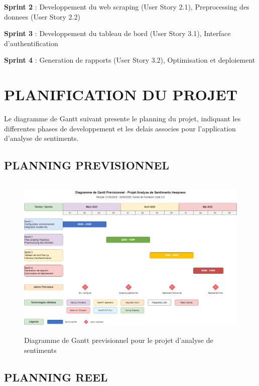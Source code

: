 \textbf{Sprint 2} : Developpement du web scraping (User Story 2.1), Preprocessing des donnees (User Story 2.2)

\textbf{Sprint 3} : Developpement du tableau de bord (User Story 3.1), Interface d'authentification

\textbf{Sprint 4} : Generation de rapports (User Story 3.2), Optimisation et deploiement

\section{PLANIFICATION DU PROJET}

Le diagramme de Gantt suivant presente le planning du projet, indiquant les differentes phases de developpement et les delais associes pour l'application d'analyse de sentiments.

\subsection{PLANNING PREVISIONNEL}

\begin{figure}[H]
\centering
\includegraphics[height=8cm , width=\textwidth]{assets/images/gantt-previsionnel.png}
\caption{Diagramme de Gantt previsionnel pour le projet d'analyse de sentiments}
\label{fig:gantt-prev}
\end{figure}

\subsection{PLANNING REEL}

